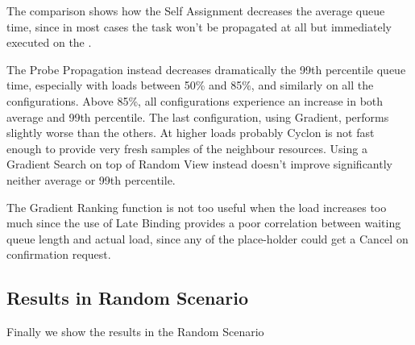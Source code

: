 \documentclass[conference]{IEEEtran}
\begin{document}
The comparison shows how the Self Assignment decreases the average queue time, since in most cases the task won't be propagated at all but immediately executed on the \tmast.

The Probe Propagation instead decreases dramatically the 99th percentile queue time, especially with loads between 50\% and 85\%, and similarly on all the configurations. Above 85\%, all configurations experience an increase in both average and 99th percentile. The last configuration, using Gradient, performs slightly worse than the others. At higher loads probably Cyclon is not fast enough to provide very fresh samples of the neighbour resources. Using a Gradient Search on top of Random View instead doesn't improve significantly neither average or 99th percentile.

The Gradient Ranking function is not too useful when the load increases too much since the use of Late Binding provides a poor correlation between waiting queue length and actual load, since any of the place-holder could get a Cancel on confirmation request.



\subsection{Results in Random Scenario}

Finally we show the results in the Random Scenario
\end{document}

